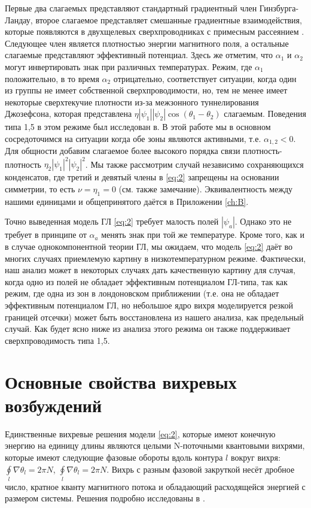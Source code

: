 Первые два слагаемых представляют стандартный градиентный член 
Гинзбурга-Ландау, второе слагаемое представляет смешанные градиентные 
взаимодействия, которые появляются в двухщелевых сверхпроводниках с примесным 
рассеянием \cite{bib:8,bib:9}. Следующее член является плотностью энергии 
магнитного поля, а остальные слагаемые представляют эффективный потенциал. 
Здесь же отметим, что \( \alpha_1 \) и \( \alpha_2 \) могут инвертировать знак 
при различных температурах. Режим, где \( \alpha_1 \) положительно, в то время 
\( \alpha_2 \) отрицательно, соответствует ситуации, когда один из группы 
не имеет собственной сверхпроводимости, но, тем не менее имеет некоторые 
сверхтекучие плотности из-за межзонного туннелирования Джозефсона, которая 
представлена \( \eta|\psi_1||\psi_2|\cos(\theta_1-\theta_2) \) слагаемым. 
Поведения типа 1,5 в этом режиме был исследован в\cite{bib:2}. В этой работе 
мы в основном сосредоточимся на ситуации когда обе зоны являются активными, 
т.е. \( \alpha_{1,2} < 0 \). Для общности добавим слагаемое более высокого 
порядка связи плотность-плотность \( \eta_2|\psi_1|^2|\psi_2|^2 \). Мы также 
рассмотрим случай независимо сохраняющихся конденсатов, где третий и девятый 
члены в \eqref{eq:2} запрещены на основании симметрии, то есть 
\( \nu = \eta_1 = 0 \) (см. также замечание\cite{bib:21}). Эквивалентность 
между нашими единицами и общепринятого даётся в Приложении \ref{ch:B}.

Точно выведенная модель ГЛ \eqref{eq:2} требует малость полей \( |\psi_a| \). 
Однако это не требует в принципе от \( \alpha_a \) менять знак при той же 
температуре. Кроме того, как и в случае однокомпонентной теории ГЛ, мы 
ожидаем, что модель \eqref{eq:2} даёт во многих случаях приемлемую картину 
в низкотемпературном режиме. Фактически, наш анализ может в некоторых случаях 
дать качественную картину для случая, когда одно из полей не обладает 
эффективным потенциалом ГЛ-типа, так как режим, где одна из зон в лондоновском 
приближении (т.е. она не обладает эффективным потенциалом ГЛ, но небольшое ядро 
вихря моделируется резкой границей отсечки) может быть восстановлена из 
нашего анализа, как предельный случай. Как будет ясно ниже из анализа этого 
режима он также поддерживает сверхпроводимость типа 1,5.

\section{Основные свойства вихревых возбуждений}

Единственные вихревые решения модели \eqref{eq:2}, которые имеют конечную 
энергию на единицу длины являются целыми N-поточными квантовыми вихрями, 
которые имеют следующие фазовые обороты вдоль контура \( l \) вокруг вихря: 
\( \oint\limits_l \nabla\theta_l = 2\pi N \), 
\( \oint\limits_l \nabla\theta_l = 2\pi N \). Вихрь с разным фазовой закруткой 
несёт дробное число, кратное кванту магнитного потока и обладающий
расходящейся энергией с размером системы. Решения подробно исследованы в
\cite{bib:22}.

